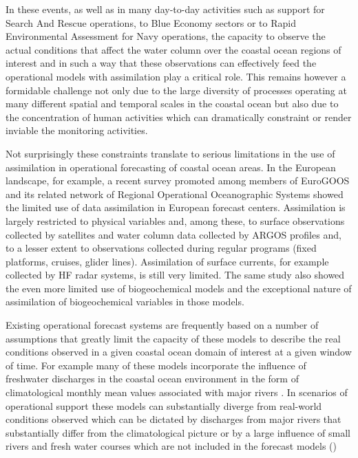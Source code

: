 In these events, as well as in many day-to-day activities such as
support for Search And Rescue operations, to Blue Economy sectors or
to Rapid Environmental Assessment for Navy operations, the capacity to
observe the actual conditions that affect the water column over the
coastal ocean regions of interest and in such a way that these
observations can effectively feed the operational models with
assimilation play a critical role. This remains however a formidable
challenge not only due to the large diversity of processes operating
at many different spatial and temporal scales in the coastal ocean but
also due to the concentration of human activities which can
dramatically constraint or render inviable the monitoring activities.

Not surprisingly these constraints translate to serious limitations in
the use of assimilation in operational forecasting of coastal ocean
areas. In the European landscape, for example, a recent survey
promoted among members of EuroGOOS and its related network of Regional
Operational Oceanographic Systems \cite{capet2020} showed the limited
use of data assimilation in European forecast centers. Assimilation
is largely restricted to physical variables and, among these, to
surface observations collected by satellites and water column data
collected by ARGOS profiles and, to a lesser extent to observations
collected during regular programs (fixed platforms, cruises, glider
lines). Assimilation of surface currents, for example collected by HF
radar systems, is still very limited. The same study also showed the
even more limited use of biogeochemical models and the exceptional
nature of assimilation of biogeochemical variables in those models.
 
Existing operational forecast systems are frequently based on a number
of assumptions that greatly limit the capacity of these models to
describe the real conditions observed in a given coastal ocean domain
of interest at a given window of time. For example many of these
models incorporate the influence of freshwater discharges in the
coastal ocean environment in the form of climatological monthly mean
values associated with major rivers \cite{marta012}.  In scenarios of
operational support these models can substantially diverge from
real-world conditions observed which can be dictated by discharges
from major rivers that substantially differ from the climatological
picture or by a large influence of small rivers and fresh water
courses which are not included in the forecast models ()
 
